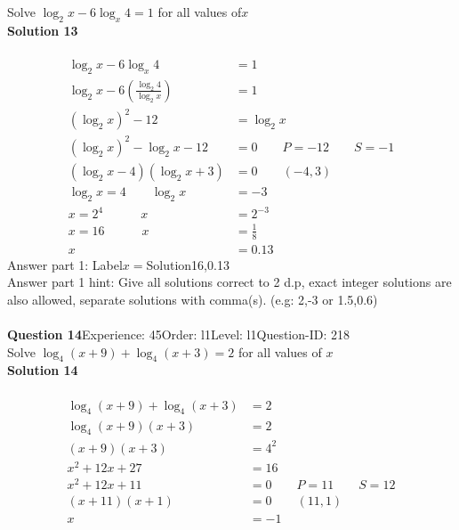 \documentclass{article}
\begin{document}
Solve $\log_{2}x-6\log_{x}4=1$ for all values of$x$\\[4pt]
\noindent\textbf{Solution 13}\\[2pt]
\\[-35pt]\begin{align*}
\log_{2}x-6\log_{x}4&=1\\[2pt]
\log_{2}x-6\left(\displaystyle\frac{\log_{2}4}{\log_{2}x}\right)&=1\\[2pt]
(\log_{2}x)^2-12&=\log_{2}x\\[2pt]
(\log_{2}x)^2-\log_{2}x-12&=0\qquad P=-12 \qquad S=-1\\[2pt]
(\log_{2}x-4)(\log_{2}x+3)&=0\qquad (-4,3)\\[2pt]
\log_{2}x=4 \qquad \log_{2}x&=-3\\[2pt]
x=2^4 \hspace{36pt} x&=2^{-3}\\[2pt]
x=16 \hspace{36pt} x&=\displaystyle\frac{1}{8}\\[2pt]
x&=0.13
\end{align*}
Answer part 1: \hspace{10pt}Label\hspace{10pt}$x=$\hspace{10pt}Solution\hspace{10pt}16,0.13\\
Answer part 1 hint: \hspace{15pt}Give all solutions correct to 2 d.p, exact integer solutions are also allowed, separate solutions with comma(s). (e.g: 2,-3 or 1.5,0.6)\\
\\[4pt]
\noindent\textbf{Question 14}\hspace{20pt}Experience: 45\hspace{20pt}Order: l1\hspace{20pt}Level: l1\hspace{20pt}Question-ID: 218\\[2pt]
Solve $\log_{4}(x+9)+\log_{4}(x+3)=2$ for all values of $x$\\[4pt]
\noindent\textbf{Solution 14}\\[2pt]
\\[-35pt]\begin{align*}
\log_{4}(x+9)+\log_{4}(x+3)&=2\\[2pt]
\log_{4}(x+9)(x+3)&=2\\[2pt]
(x+9)(x+3)&=4^2\\[2pt]
x^2+12x+27&=16\\[2pt]
x^2+12x+11&=0\qquad P=11 \qquad S=12\\[2pt]
(x+11)(x+1)&=0\qquad (11,1)\\[2pt]
x&=-1
\end{align*}
\end{document}
